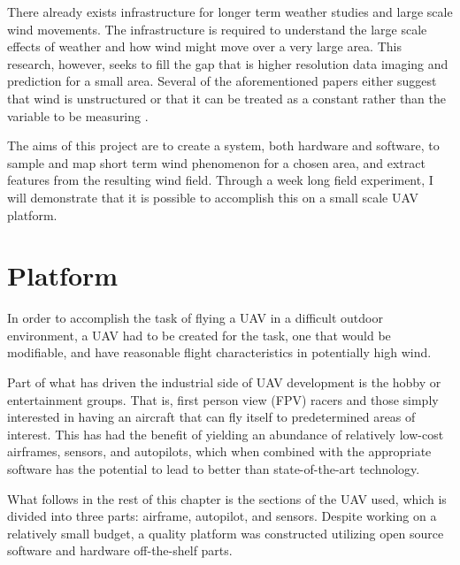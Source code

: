 \documentclass[12pt]{report}
\begin{document}
There already exists infrastructure for longer term weather studies and large scale wind movements. The infrastructure is required to understand the large scale effects of weather and how wind might move over a very large area. This research, however, seeks to fill the gap that is higher resolution data imaging and prediction for a small area. Several of the aforementioned papers either suggest that wind is unstructured \cite{Kothari14} or that it can be treated as a constant rather than the variable to be measuring \cite{Kuroki09}.

The aims of this project are to create a system, both hardware and software, to sample and map short term wind phenomenon for a chosen area, and extract features from the resulting wind field. Through a week long field experiment, I will demonstrate that it is possible to accomplish this on a small scale UAV platform.

\chapter{Platform}
In order to accomplish the task of flying a UAV in a difficult outdoor environment, a UAV had to be created for the task, one that would be modifiable, and have reasonable flight characteristics in potentially high wind. 

Part of what has driven the industrial side of UAV development is the hobby or entertainment groups. That is, first person view (FPV) racers and those simply interested in having an aircraft that can fly itself to predetermined areas of interest. This has had the benefit of yielding an abundance of relatively low-cost airframes, sensors, and autopilots, which when combined with the appropriate software has the potential to lead to better than state-of-the-art technology.

What follows in the rest of this chapter is the sections of the UAV used, which is divided into three parts: airframe, autopilot, and sensors. Despite working on a relatively small budget, a quality platform was constructed utilizing open source software and hardware off-the-shelf parts.
 
\end{document}
